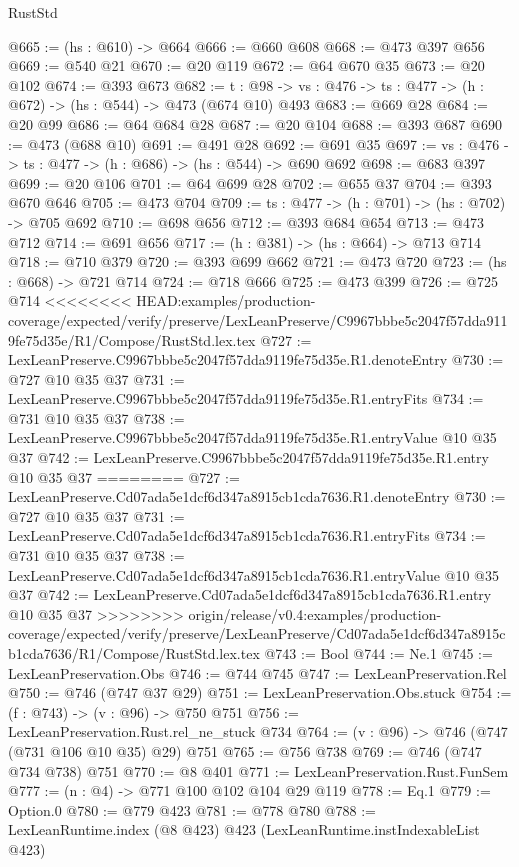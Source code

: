 \begin{lexlean}{RustStd}
\begin{coremodule}
{\begin{coremodule}
@665 := (hs : @610) -> @664
@666 := @660 @608
@668 := @473 @397 @656
@669 := @540 @21
@670 := @20 @119
@672 := @64 @670 @35
@673 := @20 @102
@674 := @393 @673
@682 := {t : @98} -> {vs : @476} -> {ts : @477} -> (h : @672) -> (hs : @544) -> @473 (@674 @10) @493
@683 := @669 @28
@684 := @20 @99
@686 := @64 @684 @28
@687 := @20 @104
@688 := @393 @687
@690 := @473 (@688 @10)
@691 := @491 @28
@692 := @691 @35
@697 := {vs : @476} -> {ts : @477} -> (h : @686) -> (hs : @544) -> @690 @692
@698 := @683 @397
@699 := @20 @106
@701 := @64 @699 @28
@702 := @655 @37
@704 := @393 @670 @646
@705 := @473 @704
@709 := {ts : @477} -> (h : @701) -> (hs : @702) -> @705 @692
@710 := @698 @656
@712 := @393 @684 @654
@713 := @473 @712
@714 := @691 @656
@717 := (h : @381) -> (hs : @664) -> @713 @714
@718 := @710 @379
@720 := @393 @699 @662
@721 := @473 @720
@723 := (hs : @668) -> @721 @714
@724 := @718 @666
@725 := @473 @399
@726 := @725 @714
<<<<<<<< HEAD:examples/production-coverage/expected/verify/preserve/LexLeanPreserve/C9967bbbe5c2047f57dda9119fe75d35e/R1/Compose/RustStd.lex.tex
@727 := LexLeanPreserve.C9967bbbe5c2047f57dda9119fe75d35e.R1.denoteEntry
@730 := @727 @10 @35 @37
@731 := LexLeanPreserve.C9967bbbe5c2047f57dda9119fe75d35e.R1.entryFits
@734 := @731 @10 @35 @37
@738 := LexLeanPreserve.C9967bbbe5c2047f57dda9119fe75d35e.R1.entryValue @10 @35 @37
@742 := LexLeanPreserve.C9967bbbe5c2047f57dda9119fe75d35e.R1.entry @10 @35 @37
========
@727 := LexLeanPreserve.Cd07ada5e1dcf6d347a8915cb1cda7636.R1.denoteEntry
@730 := @727 @10 @35 @37
@731 := LexLeanPreserve.Cd07ada5e1dcf6d347a8915cb1cda7636.R1.entryFits
@734 := @731 @10 @35 @37
@738 := LexLeanPreserve.Cd07ada5e1dcf6d347a8915cb1cda7636.R1.entryValue @10 @35 @37
@742 := LexLeanPreserve.Cd07ada5e1dcf6d347a8915cb1cda7636.R1.entry @10 @35 @37
>>>>>>>> origin/release/v0.4:examples/production-coverage/expected/verify/preserve/LexLeanPreserve/Cd07ada5e1dcf6d347a8915cb1cda7636/R1/Compose/RustStd.lex.tex
@743 := Bool
@744 := Ne.{1}
@745 := LexLeanPreservation.Obs
@746 := @744 @745
@747 := LexLeanPreservation.Rel
@750 := @746 (@747 @37 @29)
@751 := LexLeanPreservation.Obs.stuck
@754 := (f : @743) -> (v : @96) -> @750 @751
@756 := LexLeanPreservation.Rust.rel_ne_stuck @734
@764 := (v : @96) -> @746 (@747 (@731 @106 @10 @35) @29) @751
@765 := @756 @738
@769 := @746 (@747 @734 @738) @751
@770 := @8 @401
@771 := LexLeanPreservation.Rust.FunSem
@777 := (n : @4) -> @771 @100 @102 @104 @29 @119
@778 := Eq.{1}
@779 := Option.{0}
@780 := @779 @423
@781 := @778 @780
@788 := LexLeanRuntime.index (@8 @423) @423 (LexLeanRuntime.instIndexableList @423)

\end{coremodule}}
\end{coremodule}
\end{lexlean}

